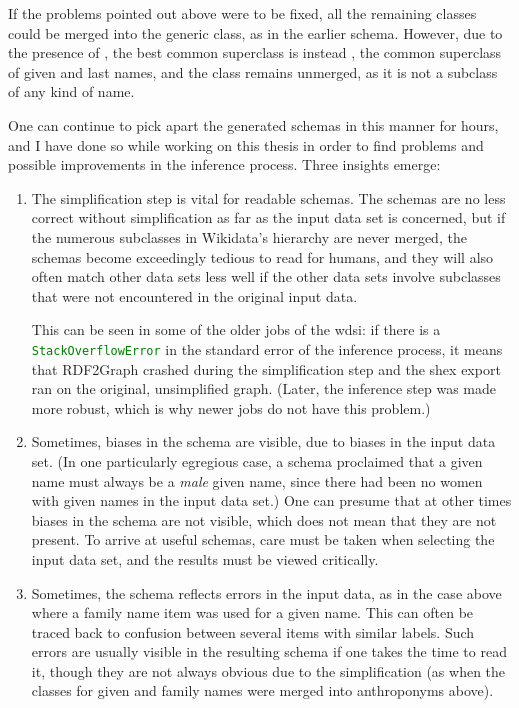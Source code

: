 If the problems pointed out above were to be fixed,
all the remaining classes could be merged into the generic  class,
as in the earlier \gls{schema}.
However, due to the presence of ,
the best common superclass is instead ,
the common superclass of given and last names,
and the  class remains unmerged,
as it is not a subclass of any kind of name.

One can continue to pick apart the generated \glspl{schema} in this manner for hours,
and I have done so while working on this thesis
in order to find problems and possible improvements in the inference process.
Three insights emerge:

\begin{enumerate}
\item The simplification step is vital for readable \glspl{schema}.
  The \glspl{schema} are no less correct without simplification as far as the input data set is concerned,
  but if the numerous subclasses in \gls{Wikidata}’s hierarchy are never merged,
  the \glspl{schema} become exceedingly tedious to read for humans,
  and they will also often match other data sets less well
  if the other data sets involve subclasses that were not encountered in the original input data.

  This can be seen in some of the older \glspl{job} of the \gls{wdsi}:
  if there is a \lstinline[language=java]{StackOverflowError} in the standard error of the inference process,
  it means that \gls{RDF2Graph} crashed during the simplification step
  and the \gls{shex} export ran on the original, unsimplified graph.
  (Later, the inference step was made more robust,
  which is why newer \glspl{job} do not have this problem.)

\item Sometimes, biases in the \gls{schema} are visible, due to biases in the input data set.
  (In one particularly egregious case,
  a \gls{schema} proclaimed that a given name must always be a \emph{male} given name,
  since there had been no women with given names in the input data set.)
  One can presume that at other times biases in the \gls{schema} are not visible,
  which does not mean that they are not present. %
  To arrive at useful \glspl{schema},
  care must be taken when selecting the input data set,
  and the results must be viewed critically. %

\item Sometimes, the \gls{schema} reflects errors in the input data,
  as in the case above where a family name \gls{item} was used for a given name.
  This can often be traced back to confusion between several \glspl{item} with similar labels.
  Such errors are usually visible in the resulting \gls{schema} if one takes the time to read it,
  though they are not always obvious due to the simplification
  (as when the classes for given and family names were merged into anthroponyms above).
\end{enumerate}

